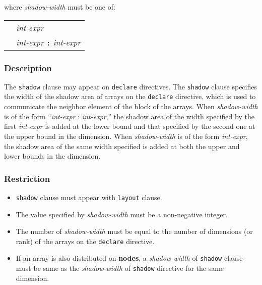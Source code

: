 \vspace{1em}
where {\it shadow-width} must be one of:
\vspace{1em}

\begin{tabular}{ll}
 \hspace{0.5cm} & {\it int-expr} \\
                & {\it int-expr} {\tt :} {\it int-expr}
\end{tabular}

\subsubsection*{Description}

The {\tt shadow} clause may appear on {\tt declare} directives.
The {\tt shadow} clause specifies the width of the shadow area of arrays on the {\tt declare} directive, which is used to communicate the neighbor element of the block of the arrays.
%
When {\it shadow-width} is of the form ``{\it int-expr} : {\it int-expr},''
the shadow area of the width specified by the first {\it int-expr} is added at the lower bound and that specified by the second
one at the upper bound in the dimension.
%
When {\it shadow-width} is of the form {\it int-expr}, the shadow
area of the same width specified is added at both the upper and lower
bounds in the dimension.
%

\subsubsection*{Restriction}
\begin{itemize}
\item {\tt shadow} clause must appear with {\tt layout} clause.
\item The value specified by {\it shadow-width} must be a non-negative integer.
\item The number of {\it shadow-width} must be equal to the number of dimensions (or rank) of the arrays on the {\tt declare} directive.
\item If an array is also distributed on {\bf nodes}, a {\it shadow-width} of {\tt shadow} clause must be same as the {\it shadow-width} of {\XMP} {\tt shadow} directive for the same dimension.
\end{itemize}

